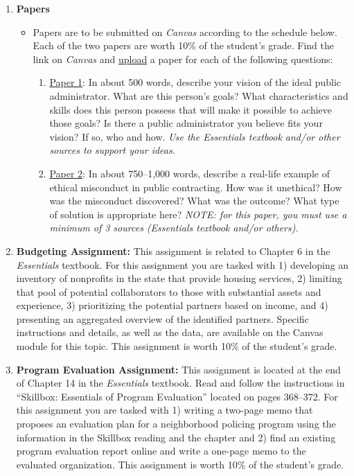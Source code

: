 \documentclass[11pt]{article}
\begin{document}
\begin{description}
\begin{enumerate}
	
		\item \textbf{Papers}
			\begin{itemize}
				\item Papers are to be submitted on \emph{Canvas} according to the schedule below. Each of the two papers are worth 10\% of the student's grade. Find the link on \emph{Canvas} and \underline{upload} a paper for each of the following questions:
				\begin{enumerate}
					\item \underline{Paper 1}: In about 500 words, describe your vision of the ideal public administrator. What are this person's goals? What characteristics and skills does this person possess that will make it possible to achieve those goals? Is there a public administrator you believe fits your vision? If so, who and how. \emph{Use the Essentials textbook and/or other sources to support your ideas.}
					\item \underline{Paper 2}: In about 750--1,000 words, describe a real-life example of ethical misconduct in public contracting. How was it unethical? How was the misconduct discovered? What was the outcome? What type of solution is appropriate here? \emph{NOTE: for this paper, you must use a minimum of 3 sources (Essentials textbook and/or others).}
				\end{enumerate}
			\end{itemize}
		\item \textbf{Budgeting Assignment:} This assignment is related to Chapter 6 in the \emph{Essentials} textbook. For this assignment you are tasked with 1) developing an inventory of nonprofits in the state that provide housing services, 2) limiting that pool of potential collaborators to those with substantial assets and experience, 3) prioritizing the potential partners based on income, and 4) presenting an aggregated overview of the identified partners. Specific instructions and details, as well as the data, are available on the Canvas module for this topic. This assignment is worth 10\% of the student's grade.
		
		\item \textbf{Program Evaluation Assignment:} This assignment is located at the end of Chapter 14 in the \emph{Essentials} textbook. Read and follow the instructions in ``Skillbox: Essentials of Program Evaluation'' located on pages 368--372. For this assignment you are tasked with 1) writing a two-page memo that proposes an evaluation plan for a neighborhood policing program using the information in the Skillbox reading and the chapter and 2) find an existing program evaluation report online and write a one-page memo to the evaluated organization. This assignment is worth 10\% of the student's grade. 
		

\end{enumerate}
\end{description}
\end{document}
